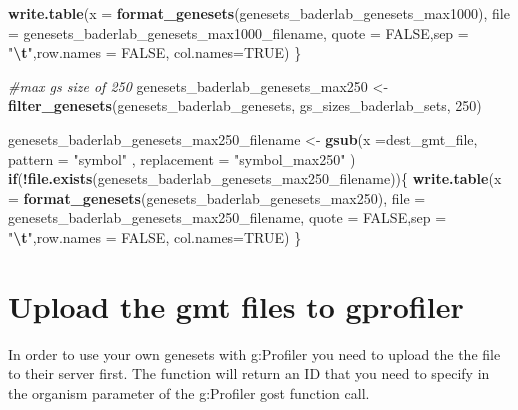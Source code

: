 \documentclass[
]{book}
\newenvironment{Shaded}{\begin{snugshade}}{\end{snugshade}}
\newcommand{\AttributeTok}[1]{\textcolor[rgb]{0.13,0.29,0.53}{#1}}
\newcommand{\CommentTok}[1]{\textcolor[rgb]{0.56,0.35,0.01}{\textit{#1}}}
\newcommand{\ConstantTok}[1]{\textcolor[rgb]{0.56,0.35,0.01}{#1}}
\newcommand{\ControlFlowTok}[1]{\textcolor[rgb]{0.13,0.29,0.53}{\textbf{#1}}}
\newcommand{\DecValTok}[1]{\textcolor[rgb]{0.00,0.00,0.81}{#1}}
\newcommand{\FunctionTok}[1]{\textcolor[rgb]{0.13,0.29,0.53}{\textbf{#1}}}
\newcommand{\NormalTok}[1]{#1}
\newcommand{\OtherTok}[1]{\textcolor[rgb]{0.56,0.35,0.01}{#1}}
\newcommand{\SpecialCharTok}[1]{\textcolor[rgb]{0.81,0.36,0.00}{\textbf{#1}}}
\newcommand{\StringTok}[1]{\textcolor[rgb]{0.31,0.60,0.02}{#1}}
\begin{document}
\begin{Shaded}
\begin{Highlighting}[]
  \FunctionTok{write.table}\NormalTok{(}\AttributeTok{x =} \FunctionTok{format\_genesets}\NormalTok{(genesets\_baderlab\_genesets\_max1000),}
            \AttributeTok{file =}\NormalTok{ genesets\_baderlab\_genesets\_max1000\_filename,}
            \AttributeTok{quote =} \ConstantTok{FALSE}\NormalTok{,}\AttributeTok{sep =} \StringTok{"}\SpecialCharTok{\textbackslash{}t}\StringTok{"}\NormalTok{,}\AttributeTok{row.names =} \ConstantTok{FALSE}\NormalTok{,}
            \AttributeTok{col.names=}\ConstantTok{TRUE}\NormalTok{)}
\NormalTok{\}}

\CommentTok{\#max gs size of 250}
\NormalTok{genesets\_baderlab\_genesets\_max250 }\OtherTok{\textless{}{-}} \FunctionTok{filter\_genesets}\NormalTok{(genesets\_baderlab\_genesets,}
\NormalTok{                                                      gs\_sizes\_baderlab\_sets, }
                                                      \DecValTok{250}\NormalTok{)}


\NormalTok{genesets\_baderlab\_genesets\_max250\_filename }\OtherTok{\textless{}{-}} \FunctionTok{gsub}\NormalTok{(}\AttributeTok{x =}\NormalTok{dest\_gmt\_file, }
                                                  \AttributeTok{pattern =} \StringTok{"symbol"}\NormalTok{ ,}
                                                  \AttributeTok{replacement =} \StringTok{"symbol\_max250"}
\NormalTok{                                                     )}
\ControlFlowTok{if}\NormalTok{(}\SpecialCharTok{!}\FunctionTok{file.exists}\NormalTok{(genesets\_baderlab\_genesets\_max250\_filename))\{}
  \FunctionTok{write.table}\NormalTok{(}\AttributeTok{x =} \FunctionTok{format\_genesets}\NormalTok{(genesets\_baderlab\_genesets\_max250),}
            \AttributeTok{file =}\NormalTok{ genesets\_baderlab\_genesets\_max250\_filename,}
            \AttributeTok{quote =} \ConstantTok{FALSE}\NormalTok{,}\AttributeTok{sep =} \StringTok{"}\SpecialCharTok{\textbackslash{}t}\StringTok{"}\NormalTok{,}\AttributeTok{row.names =} \ConstantTok{FALSE}\NormalTok{,}
            \AttributeTok{col.names=}\ConstantTok{TRUE}\NormalTok{)}
\NormalTok{\}}
\end{Highlighting}
\end{Shaded}

\section{Upload the gmt files to gprofiler}\label{upload-the-gmt-files-to-gprofiler}

In order to use your own genesets with g:Profiler you need to upload the the file to their server first. The function will return an ID that you need to specify in the organism parameter of the g:Profiler gost function call.
\end{document}
